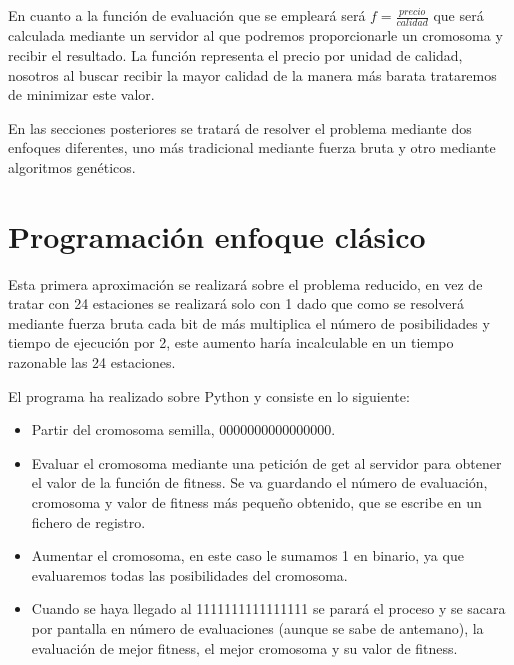\documentclass[12pt, spanish, pdftex]{UC3M_document}
\begin{document}
En cuanto a la función de evaluación que se empleará será $f=\frac {precio} {calidad}$ que será calculada mediante un servidor al que podremos proporcionarle un cromosoma y recibir el resultado. La función representa el precio por unidad de calidad, nosotros al buscar recibir la mayor calidad de la manera más barata trataremos de minimizar este valor.

En las secciones posteriores se tratará de resolver el problema mediante dos enfoques diferentes, uno más tradicional mediante fuerza bruta y otro mediante algoritmos genéticos.

\section{Programación enfoque clásico}
Esta primera aproximación se realizará sobre el problema reducido, en vez de tratar con 24 estaciones se realizará solo con 1 dado que como se resolverá mediante fuerza bruta cada bit de más multiplica el número de posibilidades y tiempo de ejecución por 2, este aumento haría incalculable en un tiempo razonable las 24 estaciones.

El programa ha realizado sobre Python y consiste en lo siguiente:
\begin{itemize}
	\item Partir del cromosoma semilla, 0000000000000000.
	\item Evaluar el cromosoma mediante una petición de get al servidor para obtener el valor de la función de fitness. Se va guardando el número de evaluación, cromosoma y valor de fitness más pequeño obtenido, que se escribe en un fichero de registro.
	\item Aumentar el cromosoma, en este caso le sumamos 1 en binario, ya que evaluaremos todas las posibilidades del cromosoma.
	\item Cuando se haya llegado al 1111111111111111 se parará el proceso y se sacara por pantalla en número de evaluaciones (aunque se sabe de antemano), la evaluación de mejor fitness, el mejor cromosoma y su valor de fitness.
\end{itemize}
\end{document}
